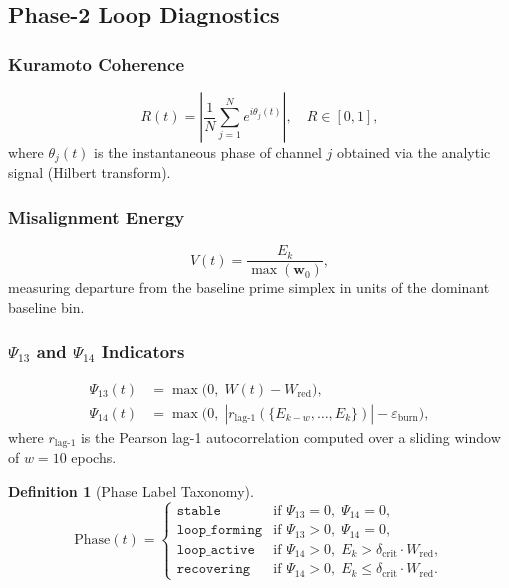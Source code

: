 \documentclass[12pt,a4paper]{article}
\theoremstyle{plain}
\theoremstyle{definition}
\newtheorem{definition}[theorem]{Definition}
\renewcommand{\Psi}{\varPsi}
\begin{document}
\subsection{Phase-2 Loop Diagnostics}
\label{sec:math:phase2}

\subsubsection{Kuramoto Coherence}
\begin{equation}
  R(t) = \left|\frac{1}{N}\sum_{j=1}^{N} e^{i\theta_j(t)}\right|, \quad R \in [0,1],
  \label{eq:kuramoto}
\end{equation}
where $\theta_j(t)$ is the instantaneous phase of channel $j$ obtained via the analytic
signal (Hilbert transform).

\subsubsection{Misalignment Energy}
\begin{equation}
  V(t) = \frac{E_k}{\max(\mathbf{w}_0)},
  \label{eq:misalign}
\end{equation}
measuring departure from the baseline prime simplex in units of the dominant baseline
bin.

\subsubsection{$\Psi_{13}$ and $\Psi_{14}$ Indicators}
\begin{align}
  \Psi_{13}(t) &= \max\!\bigl(0,\; W(t) - W_{\mathrm{red}}\bigr), \label{eq:psi13}\\
  \Psi_{14}(t) &= \max\!\bigl(0,\; |r_{\mathrm{lag\text{-}1}}(\{E_{k-w},\ldots,E_k\})| - \varepsilon_{\mathrm{burn}}\bigr),
  \label{eq:psi14}
\end{align}
where $r_{\mathrm{lag\text{-}1}}$ is the Pearson lag-1 autocorrelation computed over a
sliding window of $w = 10$ epochs.

\begin{definition}[Phase Label Taxonomy]
\begin{equation}
  \mathrm{Phase}(t) =
  \begin{cases}
    \texttt{stable}       & \text{if } \Psi_{13}=0,\; \Psi_{14}=0, \\
    \texttt{loop\_forming} & \text{if } \Psi_{13}>0,\; \Psi_{14}=0, \\
    \texttt{loop\_active}  & \text{if } \Psi_{14}>0,\; E_k > \delta_{\mathrm{crit}}\cdot W_{\mathrm{red}}, \\
    \texttt{recovering}   & \text{if } \Psi_{14}>0,\; E_k \leq \delta_{\mathrm{crit}}\cdot W_{\mathrm{red}}.
  \end{cases}
  \label{eq:phaselabel}
\end{equation}
\end{definition}
\end{document}
